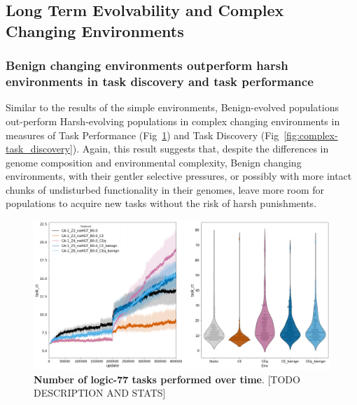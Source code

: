 \documentclass[PhD]{msu-thesis}
\begin{document}

\subsection{Long Term Evolvability and Complex Changing Environments}

\subsubsection{Benign changing environments outperform harsh environments in task discovery and task performance}
Similar to the results of the simple environments, Benign-evolved populations out-perform Harsh-evolving
populations in complex changing environments in measures of Task Performance (Fig~\ref{fig:complex-task_performance}) and Task Discovery (Fig~\ref{fig:complex-task_discovery}). Again, this result suggests that, despite the differences in genome composition and environmental complexity, Benign changing environments, with their gentler selective pressures, or possibly with more intact chunks of undisturbed functionality in their genomes, leave more room for populations to acquire new tasks without the risk of harsh punishments. 

	\begin{figure}[!h]
	\includegraphics[trim={0 0 0 0}, clip, width=0.75\columnwidth]{figures/LTE/lte-complex-task_performance.png}
	\caption{\textbf{Number of logic-77 tasks performed over time}. [TODO DESCRIPTION AND STATS]%
	}
	\label{fig:complex-task_performance}
	\end{figure}
\end{document}
